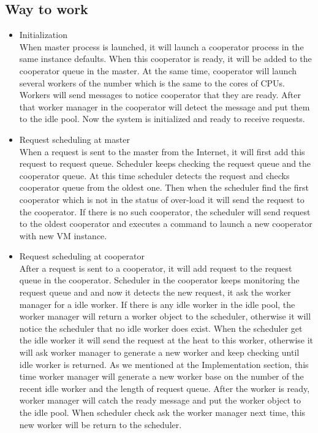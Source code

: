\documentclass[JIP]{ipsj}
\begin{document}
\subsection{Way to work}
\begin{itemize}
\item Initialization\\
When master process is launched, it will launch a cooperator process in the same instance defaults. When this cooperator is ready, it will be added to the cooperator queue in the master. At the same time, cooperator will launch several workers of the number which is the same to the cores of CPUs. Workers will send messages to notice cooperator that they are ready. After that worker manager in the cooperator will detect the message and put them to the idle pool. Now the system is initialized and ready to receive requests.

\item Request scheduling at master\\
When a request is sent to the master from the Internet, it will first add this request to request queue. Scheduler keeps checking the request queue and the cooperator queue. At this time scheduler detects the request and checks cooperator queue from the oldest one. Then when the scheduler find the first cooperator which is not in the status of over-load it will send the request to the cooperator. If there is no such cooperator, the scheduler will send request to the oldest cooperator and executes a command to launch a new cooperator with new VM instance.

\item Request scheduling at cooperator\\
After a request is sent to a cooperator, it will add request to the request queue in the cooperator. Scheduler in the cooperator keeps monitoring the request queue and and now it detects the new request, it ask the worker manager for a idle worker. If there is any idle worker in the idle pool, the worker manager will return a worker object to the scheduler, otherwise it will notice the scheduler that no idle worker does exist. When the scheduler get the idle worker it will send the request at the heat to this worker, otherwise it will ask worker manager to generate a new worker and keep checking until idle worker is returned. As we mentioned at the Implementation section, this time worker manager will generate a new worker base on the number of the recent idle worker and the length of request queue. After the worker is ready, worker manager will catch the ready message and put the worker object to the idle pool. When scheduler check ask the worker manager next time, this new worker will be return to the scheduler.


\end{itemize}
\end{document}
